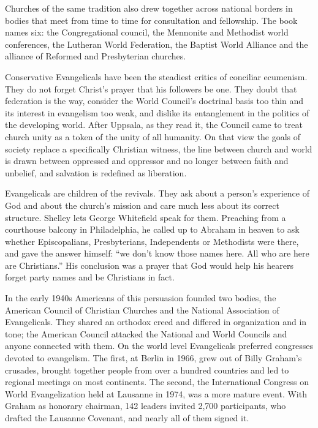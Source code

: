 Churches of the same tradition also drew together across national borders in bodies that meet from
time to time for consultation and fellowship. The book names six: the Congregational council, the
Mennonite and Methodist world conferences, the Lutheran World Federation, the Baptist World Alliance and the alliance of Reformed and Presbyterian churches.

Conservative Evangelicals have been the steadiest critics of conciliar ecumenism. They do not forget
Christ's prayer that his followers be one. They doubt that federation is the way, consider the World
Council's doctrinal basis too thin and its interest in evangelism too weak, and dislike its
entanglement in the politics of the developing world. After Uppsala, as they read it, the Council
came to treat church unity as a token of the unity of all humanity. On that view the goals of society
replace a specifically Christian witness, the line between church and world is drawn between
oppressed and oppressor and no longer between faith and unbelief, and salvation is redefined as
liberation.

Evangelicals are children of the revivals. They ask about a person's experience of God and about the
church's mission and care much less about its correct structure. Shelley lets George Whitefield
speak for them. Preaching from a courthouse balcony in Philadelphia, he called up to Abraham in
heaven to ask whether Episcopalians, Presbyterians, Independents or Methodists were there, and gave
the answer himself: ``we don't know those names here. All who are here are Christians.'' His
conclusion was a prayer that God would help his hearers forget party names and be Christians in fact.

In the early 1940s Americans of this persuasion founded two bodies, the American Council of Christian Churches and the National Association of Evangelicals. They shared an orthodox creed and
differed in organization and in tone; the American Council attacked the National and World Councils
and anyone connected with them. On the world level Evangelicals preferred congresses devoted to
evangelism. The first, at Berlin in 1966, grew out of Billy Graham's crusades, brought together
people from over a hundred countries and led to regional meetings on most continents. The second, the
International Congress on World Evangelization held at Lausanne in 1974, was a more mature event.
With Graham as honorary chairman, 142 leaders invited 2,700 participants, who drafted the Lausanne
Covenant, and nearly all of them signed it.


